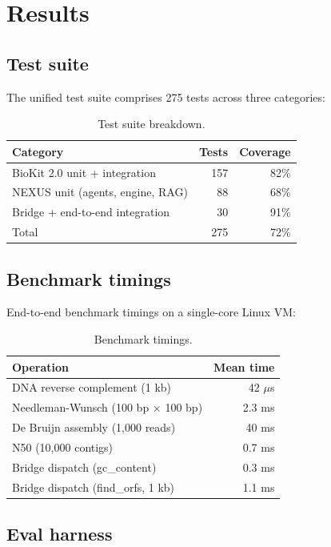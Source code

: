 \documentclass[11pt,a4paper]{article}
\begin{document}
\section{Results}

\subsection{Test suite}

The unified test suite comprises 275 tests across three categories:

\begin{table}[h]
\centering
\begin{tabular}{lrr}
\toprule
Category & Tests & Coverage \\
\midrule
BioKit 2.0 unit + integration & 157 & 82\% \\
NEXUS unit (agents, engine, RAG) & 88  & 68\% \\
Bridge + end-to-end integration & 30  & 91\% \\
\midrule
Total & 275 & 72\% \\
\bottomrule
\end{tabular}
\caption{Test suite breakdown.}
\end{table}

\subsection{Benchmark timings}

End-to-end benchmark timings on a single-core Linux VM:

\begin{table}[h]
\centering
\begin{tabular}{lr}
\toprule
Operation & Mean time \\
\midrule
DNA reverse complement (1 kb) & 42 $\mu$s \\
Needleman-Wunsch (100 bp $\times$ 100 bp) & 2.3 ms \\
De Bruijn assembly (1,000 reads) & 40 ms \\
N50 (10,000 contigs) & 0.7 ms \\
Bridge dispatch (gc\_content) & 0.3 ms \\
Bridge dispatch (find\_orfs, 1 kb) & 1.1 ms \\
\bottomrule
\end{tabular}
\caption{Benchmark timings.}
\end{table}

\subsection{Eval harness}
\end{document}
